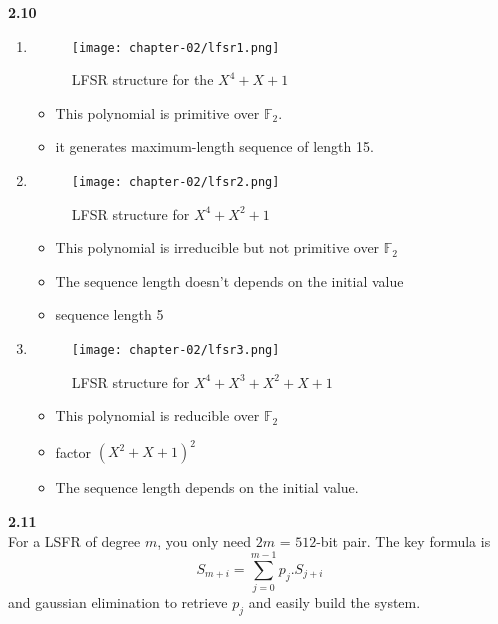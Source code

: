 \textbf{2.10}
\begin{enumerate}
    \item \begin{figure}[h!]
    \centering
    \texttt{[image: chapter-02/lfsr1.png]}
    \caption{LFSR structure for the $X^4 + X+1$}
    \label{fig:lfsr1}
\end{figure}
\begin{itemize}
    \item This polynomial is primitive over $\mathbb{F}_2$.
    \item it generates maximum-length sequence of length 15.
\end{itemize}
    \item 
    \begin{figure}[h!]
        \centering
        \texttt{[image: chapter-02/lfsr2.png]}
        \caption{LFSR structure for $X^4 + X^2+1$}
        \label{fig:lfsr2}
    \end{figure}
    \begin{itemize}
        \item This polynomial is irreducible but not primitive over $\mathbb{F}_2$
        \item The sequence length doesn't depends on the initial value
        \item sequence length 5
    \end{itemize}
    \item 
    \begin{figure}[h!]
        \centering
        \texttt{[image: chapter-02/lfsr3.png]}
        \caption{LFSR structure for $X^4 + X^3+X^2+X+1$}
        \label{fig:lfsr3}
    \end{figure}
    \begin{itemize}
        \item This polynomial is reducible over $\mathbb{F}_2$
        \item factor $(X^2+X+1)^2$
        \item The sequence length depends on the initial value.
    \end{itemize}
\end{enumerate}

\textbf{2.11}\\
For a LSFR of degree $m$, you only need $2m$ = $512$-bit pair.
The key formula is \begin{equation*}
    S_{m+i} = \sum_{j=0}^{m-1} p_j . S_{j+i} 
\end{equation*}
and gaussian elimination to retrieve $p_j$ and easily build the system.\\

